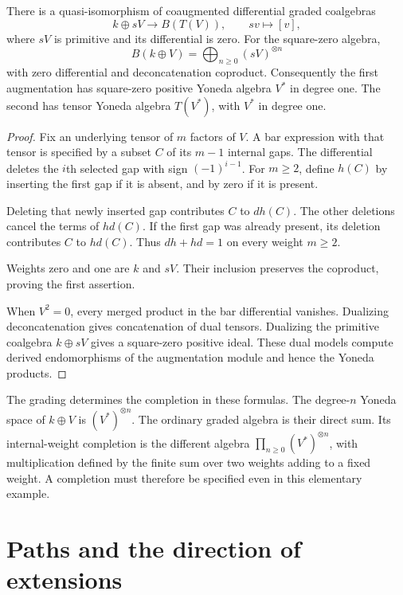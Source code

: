 \begin{proposition}
\label{prop:alg-free-square-zero}
There is a quasi-isomorphism of coaugmented differential graded coalgebras
\[
 k\oplus sV\longrightarrow B(T(V)),\qquad sv\longmapsto[v],
\]
where $sV$ is primitive and its differential is zero.
For the square-zero algebra,
\[
 B(k\oplus V)=\bigoplus_{n\ge0}(sV)^{\otimes n}
\]
with zero differential and deconcatenation coproduct.
Consequently the first augmentation has square-zero positive Yoneda algebra $V^*$ in degree one. The second has tensor Yoneda algebra $T(V^*)$, with $V^*$ in degree one.
\end{proposition}
\begin{proof}
Fix an underlying tensor of $m$ factors of $V$.
A bar expression with that tensor is specified by a subset $C$ of its $m-1$ internal gaps.
The differential deletes the $i$th selected gap with sign $(-1)^{i-1}$.
For $m\ge2$, define $h(C)$ by inserting the first gap if it is absent, and by zero if it is present.

Deleting that newly inserted gap contributes $C$ to $dh(C)$. The other deletions cancel the terms of $hd(C)$.
If the first gap was already present, its deletion contributes $C$ to $hd(C)$.
Thus $dh+hd=1$ on every weight $m\ge2$.

Weights zero and one are $k$ and $sV$.
Their inclusion preserves the coproduct, proving the first assertion.

When $V^2=0$, every merged product in the bar differential vanishes.
Dualizing deconcatenation gives concatenation of dual tensors.
Dualizing the primitive coalgebra $k\oplus sV$ gives a square-zero positive ideal.
These dual models compute derived endomorphisms of the augmentation module and hence the Yoneda products.
\end{proof}

The grading determines the completion in these formulas.
The degree-$n$ Yoneda space of $k\oplus V$ is $(V^*)^{\otimes n}$. The ordinary graded algebra is their direct sum.
Its internal-weight completion is the different algebra
$\prod_{n\ge0}(V^*)^{\otimes n}$, with multiplication defined by the finite sum over two weights adding to a fixed weight.
A completion must therefore be specified even in this elementary example.

\section{Paths and the direction of extensions}

